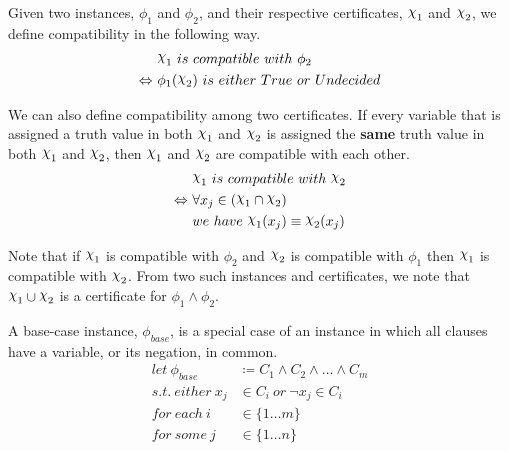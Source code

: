 \begin{definition}[Compatibility]
\label{def:compatibility}
    Given two instances, $\phi_1$ and $\phi_2$, and their respective certificates, $\rchi_1$ and $\rchi_2$, we define compatibility in the following way.
    \begin{align*}
        & \rchi_1~ is~ compatible~ with~ \phi_2 \\
        \Leftrightarrow~ & \phi_1(\rchi_2)~ is~ either~ True~ or~ Undecided
    \end{align*}

    We can also define compatibility among two certificates.
    If every variable that is assigned a truth value in both $\rchi_1$ and $\rchi_2$ is assigned the \textbf{same} truth value in both $\rchi_1$ and $\rchi_2$, then $\rchi_1$ and $\rchi_2$ are compatible with each other.
    \begin{align*}
        & \rchi_1~ is~ compatible~ with~ \rchi_2 \\
        \Leftrightarrow~ & \forall x_j \in (\rchi_1 \cap \rchi_2) \\
        & we~ have~ \rchi_1(x_j) \equiv \rchi_2(x_j)
    \end{align*}
\end{definition}

Note that if $\rchi_1$ is compatible with $\phi_2$ and $\rchi_2$ is compatible with $\phi_1$ then $\rchi_1$ is compatible with $\rchi_2$.
From two such instances and certificates, we note that $\rchi_1 \cup \rchi_2$ is a certificate for $\phi_1 \land \phi_2$.

\begin{definition}
\label{def:base-case-instance}
    A base-case instance, $\phi_{base}$, is a special case of an instance in which all clauses have a variable, or its negation, in common.
    \begin{align*}
        let~ \phi_{base} & \coloneqq C_1 \land C_2 \land \ldots \land C_m \\
        s.t.~ either~ x_j & \in C_i~ or~ \lnot x_j \in C_i \\
        for~ each~ i & \in \{ 1 \dots m \} \\
        for~ some~ j & \in \{ 1 \dots n \}
    \end{align*}
\end{definition}

